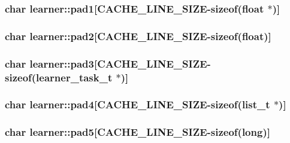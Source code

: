\hypertarget{structlearner_ade90eb31b279e01ad5939f4f22552aed}{
\subsubsection[{pad1}]{\setlength{\rightskip}{0pt plus 5cm}char learner\-::pad1\mbox{[}{\bf C\-A\-C\-H\-E\-\_\-\-L\-I\-N\-E\-\_\-\-S\-I\-Z\-E}-\/sizeof(float $\ast$)\mbox{]}}}\label{structlearner_ade90eb31b279e01ad5939f4f22552aed}
\hypertarget{structlearner_ad2de1f68bad84f37251028219aa2e1c7}{
\subsubsection[{pad2}]{\setlength{\rightskip}{0pt plus 5cm}char learner\-::pad2\mbox{[}{\bf C\-A\-C\-H\-E\-\_\-\-L\-I\-N\-E\-\_\-\-S\-I\-Z\-E}-\/sizeof(float)\mbox{]}}}\label{structlearner_ad2de1f68bad84f37251028219aa2e1c7}
\hypertarget{structlearner_a7da8752af7cb1db03c0b80b1604dc6d0}{
\subsubsection[{pad3}]{\setlength{\rightskip}{0pt plus 5cm}char learner\-::pad3\mbox{[}{\bf C\-A\-C\-H\-E\-\_\-\-L\-I\-N\-E\-\_\-\-S\-I\-Z\-E}-\/sizeof({\bf learner\-\_\-task\-\_\-t} $\ast$)\mbox{]}}}\label{structlearner_a7da8752af7cb1db03c0b80b1604dc6d0}
\hypertarget{structlearner_a85d63103208ae74ef5629b66743a4e8c}{
\subsubsection[{pad4}]{\setlength{\rightskip}{0pt plus 5cm}char learner\-::pad4\mbox{[}{\bf C\-A\-C\-H\-E\-\_\-\-L\-I\-N\-E\-\_\-\-S\-I\-Z\-E}-\/sizeof({\bf list\-\_\-t} $\ast$)\mbox{]}}}\label{structlearner_a85d63103208ae74ef5629b66743a4e8c}
\hypertarget{structlearner_a662001f67ea04c80b5759a82ed086421}{
\subsubsection[{pad5}]{\setlength{\rightskip}{0pt plus 5cm}char learner\-::pad5\mbox{[}{\bf C\-A\-C\-H\-E\-\_\-\-L\-I\-N\-E\-\_\-\-S\-I\-Z\-E}-\/sizeof(long)\mbox{]}}}\label{structlearner_a662001f67ea04c80b5759a82ed086421}
